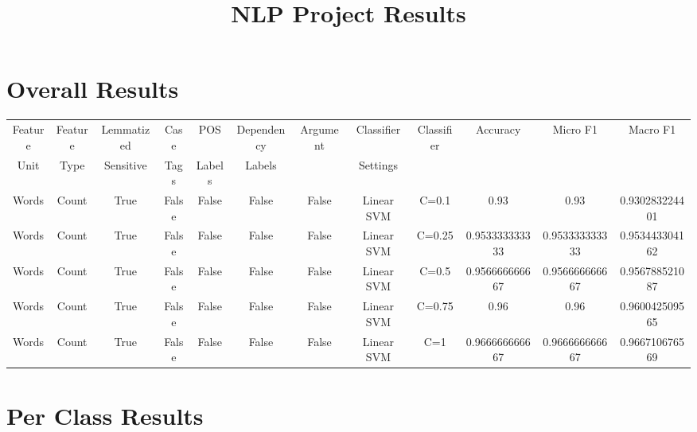 \documentclass{article}
\begin{document}
  \title{NLP Project Results}

  \maketitle
  
\section{Overall Results}
    
  \begin{tabular}{|c|c|c|c|c|c|c|c|c|c|c|c|}
  \hline
  Feature  & Feature  & Lemmatized & Case  &  POS  &  Dependency  &  Argument  & Classifier & Classifier  & Accuracy & Micro F1 & Macro F1 \\
  Unit & Type & Sensitive & Tags &  Labels &  Labels & & Settings & & & &  \\
  \hline
Words & Count & True & False & False & False & False & Linear SVM & C=0.1 & 0.93 & 0.93 & 0.930283224401 \\ 
Words & Count & True & False & False & False & False & Linear SVM & C=0.25 & 0.953333333333 & 0.953333333333 & 0.953443304162 \\ 
Words & Count & True & False & False & False & False & Linear SVM & C=0.5 & 0.956666666667 & 0.956666666667 & 0.956788521087 \\ 
Words & Count & True & False & False & False & False & Linear SVM & C=0.75 & 0.96 & 0.96 & 0.960042509565 \\ 
Words & Count & True & False & False & False & False & Linear SVM & C=1 & 0.966666666667 & 0.966666666667 & 0.966710676569 \\ 
\hline
  \end{tabular}
  
  \clearpage
  \section{Per Class Results}
    
\end{document}
